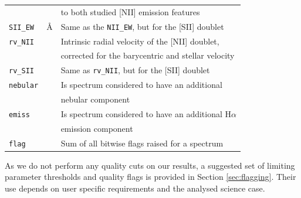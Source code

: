 \begin{table}
\begin{tabular}{l c l}
		& & to both studied [NII] emission features \\
		\texttt{SII\_EW} & \AA & Same as the \texttt{NII\_EW}, but for the [SII] doublet \\
		\texttt{rv\_NII} & \kms & Intrinsic radial velocity of the [NII] doublet, \\
		& & corrected for the barycentric and stellar velocity \\
		\texttt{rv\_SII} & \kms & Same as \texttt{rv\_NII}, but for the [SII] doublet \\
		\texttt{nebular} & & Is spectrum considered to have an additional \\
		& & nebular component \\
		\texttt{emiss} & & Is spectrum considered to have an additional H$\alpha$ \\
		& & emission component \\
		\texttt{flag} & & Sum of all bitwise flags raised for a spectrum \\
		\hline
	\end{tabular}
\end{table}

As we do not perform any quality cuts on our results, a suggested set of limiting parameter thresholds and quality flags is provided in Section \ref{sec:flagging}. Their use depends on user specific requirements and the analysed science case.

